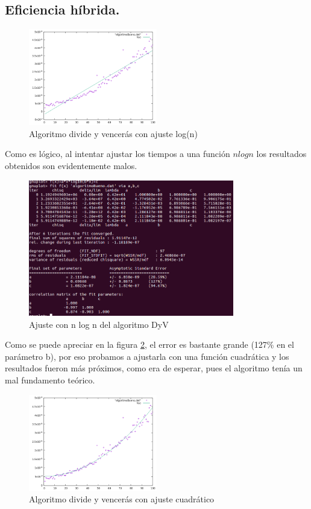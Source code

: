 \documentclass[a4paper, 11pt]{article}
\begin{document}
\subsection{Eficiencia híbrida.}
\begin{figure}[!hbp]
	\includegraphics[width=0.5\textwidth]{algBueno(log).png}
	\caption{ Algoritmo divide y vencerás con ajuste log(n)	\label{Algoritmo divide y vencerás con ajuste log(n)}}
\end{figure}
Como es lógico, al intentar ajustar los tiempos a una función $nlogn$ los resultados obtenidos son evidentemente malos.
\begin{figure}[!htp]
	\includegraphics[width=0.8\textwidth]{dyvajuste1.png}
	\caption{Ajuste con n log n del algoritmo DyV	\label{AJuste1}}
\end{figure}

Como se puede apreciar en la figura \ref{AJuste1}, el error es bastante grande (127\% en el parámetro b), por eso probamos a ajustarla con una función cuadrática y los resultados fueron más próximos, como era de esperar, pues el algoritmo tenía un mal fundamento teórico.

\begin{figure}[!hbp]
	\includegraphics[width=0.5\textwidth]{algBueno(n2).png}
	\caption{ Algoritmo divide y vencerás con ajuste cuadrático	\label{Algoritmo divideyv ajuste cuadrativo}}
\end{figure}
\end{document}
